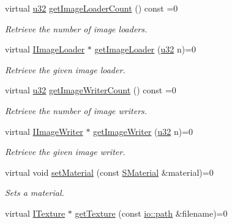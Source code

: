 \begin{DoxyCompactItemize}
virtual \hyperlink{namespaceirr_a0416a53257075833e7002efd0a18e804}{u32} \hyperlink{classirr_1_1video_1_1IVideoDriver_a92535921ad01c90570533ba60b0b76b2}{get\+Image\+Loader\+Count} () const =0
\begin{DoxyCompactList}\small\item\em Retrieve the number of image loaders. \end{DoxyCompactList}\item 
virtual \hyperlink{classirr_1_1video_1_1IImageLoader}{I\+Image\+Loader} $\ast$ \hyperlink{classirr_1_1video_1_1IVideoDriver_a5cc08e7cd2ce2a30275e22ce13bb1013}{get\+Image\+Loader} (\hyperlink{namespaceirr_a0416a53257075833e7002efd0a18e804}{u32} n)=0
\begin{DoxyCompactList}\small\item\em Retrieve the given image loader. \end{DoxyCompactList}\item 
virtual \hyperlink{namespaceirr_a0416a53257075833e7002efd0a18e804}{u32} \hyperlink{classirr_1_1video_1_1IVideoDriver_a173f33f0537a1511abdf35ed235a683a}{get\+Image\+Writer\+Count} () const =0
\begin{DoxyCompactList}\small\item\em Retrieve the number of image writers. \end{DoxyCompactList}\item 
virtual \hyperlink{classirr_1_1video_1_1IImageWriter}{I\+Image\+Writer} $\ast$ \hyperlink{classirr_1_1video_1_1IVideoDriver_acdc5e788993c117efebb22e155ab6a77}{get\+Image\+Writer} (\hyperlink{namespaceirr_a0416a53257075833e7002efd0a18e804}{u32} n)=0
\begin{DoxyCompactList}\small\item\em Retrieve the given image writer. \end{DoxyCompactList}\item 
virtual void \hyperlink{classirr_1_1video_1_1IVideoDriver_a8c9e31b41b7e6fd26cf65ce538ebab05}{set\+Material} (const \hyperlink{classirr_1_1video_1_1SMaterial}{S\+Material} \&material)=0
\begin{DoxyCompactList}\small\item\em Sets a material. \end{DoxyCompactList}\item 
virtual \hyperlink{classirr_1_1video_1_1ITexture}{I\+Texture} $\ast$ \hyperlink{classirr_1_1video_1_1IVideoDriver_af4055165190e4adf221c6dc6f2434ea0}{get\+Texture} (const \hyperlink{namespaceirr_1_1io_a6468281622ce3a1c46b72e19f32dded5}{io\+::path} \&filename)=0

\end{DoxyCompactItemize}

